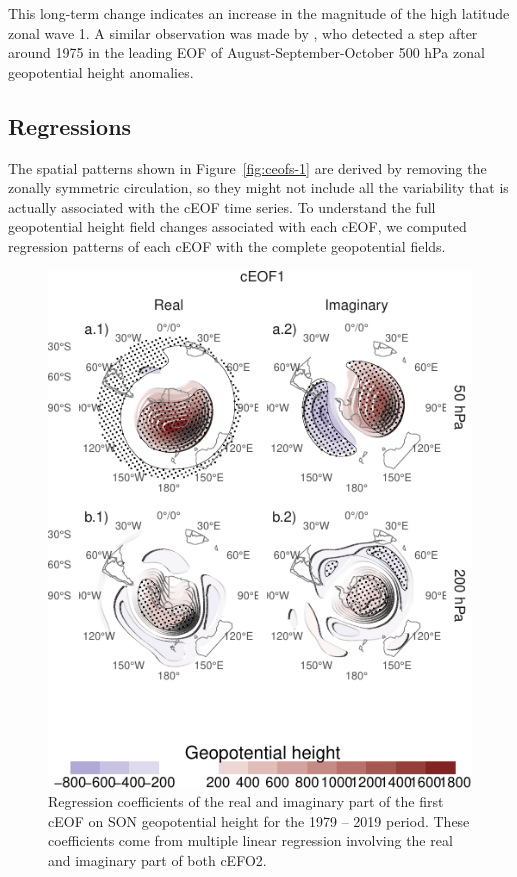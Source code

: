 \documentclass[smallextended]{svjour3}       %
\begin{document}
This long-term change indicates an increase in the magnitude of the high latitude zonal wave 1. A similar observation was made by \citet{raphael2003}, who detected a step after around 1975 in the leading EOF of August-September-October 500 hPa zonal geopotential height anomalies.

\hypertarget{regressions}{%
\subsection{Regressions}\label{regressions}}

The spatial patterns shown in Figure~\ref{fig:ceofs-1} are derived by removing the zonally symmetric circulation, so they might not include all the variability that is actually associated with the cEOF time series. To understand the full geopotential height field changes associated with each cEOF, we computed regression patterns of each cEOF with the complete geopotential fields.



\begin{figure}
\centering
\includegraphics{../figures/eof1-regr-gh-1.pdf}
\caption{\label{fig:eof1-regr-gh}Regression coefficients of the real and imaginary part of the first cEOF on SON geopotential height for the 1979 -- 2019 period. These coefficients come from multiple linear regression involving the real and imaginary part of both cEFO2.}
\end{figure}
\end{document}
